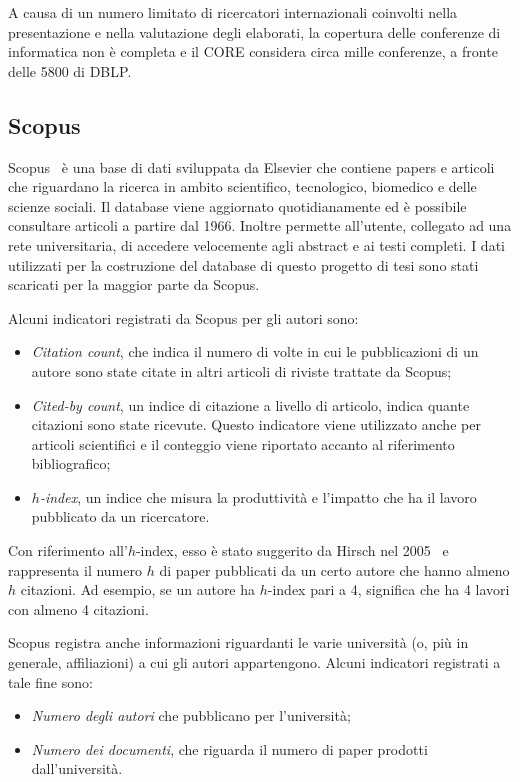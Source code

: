 A causa di un numero limitato di ricercatori internazionali coinvolti nella presentazione e nella valutazione degli elaborati, la copertura delle conferenze di informatica non è completa e il CORE considera circa mille conferenze, a fronte delle 5800 di DBLP.


\subsection{Scopus}\label{sec:scopus}

Scopus~\cite{scopus} è una base di dati sviluppata da Elsevier che contiene
papers e articoli che riguardano la ricerca in ambito scientifico, tecnologico,
biomedico e delle scienze sociali. Il database viene aggiornato quotidianamente
ed è possibile consultare articoli a partire dal 1966. Inoltre permette
all'utente, collegato ad una rete universitaria, di accedere velocemente agli
abstract e ai testi completi.
I dati utilizzati per la costruzione del database di questo progetto di tesi sono stati scaricati per la maggior parte da Scopus. 

Alcuni indicatori registrati da Scopus per gli autori sono:
\begin{itemize}
    \item \textit{Citation count}, che indica il numero di volte in cui le
    pubblicazioni di un autore sono state citate in altri articoli di riviste
    trattate da Scopus;
    \item \textit{Cited-by count}, un indice di citazione a livello di articolo,
    indica quante citazioni sono state ricevute. Questo indicatore viene
    utilizzato anche per articoli scientifici e il conteggio viene riportato
    accanto al riferimento bibliografico;
    \item \textit{$h$-index}, un indice che misura la produttività e l'impatto che
    ha il lavoro pubblicato da un ricercatore.
\end{itemize}

Con riferimento all'$h$-index, esso è stato suggerito da Hirsch nel 2005~\cite{hirsch2005}
e rappresenta il numero $h$ di paper pubblicati da un certo autore che hanno
almeno $h$ citazioni. Ad esempio, se un autore ha $h$-index pari a 4, significa
che ha 4 lavori con almeno 4 citazioni.

Scopus registra anche informazioni riguardanti le varie università (o, più
in generale, affiliazioni) a cui gli autori appartengono. Alcuni indicatori
registrati a tale fine sono:
\begin{itemize}
    \item \textit{Numero degli autori} che pubblicano per l'università;
    \item \textit{Numero dei documenti}, che riguarda il numero di paper prodotti dall'università.
\end{itemize}


